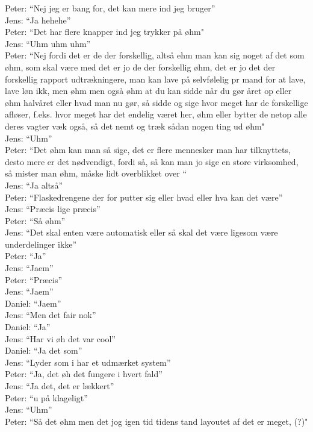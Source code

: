 Peter: “Nej jeg er bang for, det kan mere ind jeg bruger”\\
Jens: “Ja hehehe”\\
Peter: “Det har flere knapper ind jeg trykker på øhm"\\
Jens: “Uhm uhm uhm”\\
Peter: “Nej fordi det er de der forskellig, altså ehm man kan sig noget af det som øhm, som skal være med det er jo de der forskellig øhm, det er jo det der forskellig rapport udtrækningere, man kan lave på selvfølelig pr mand for at lave, lave løn ikk, men øhm men også øhm at du kan sidde når du gør året op eller øhm halvåret eller hvad man nu gør, så sidde og sige hvor meget har de forskellige afløser, f.eks. hvor meget har det endelig været her, øhm eller bytter de netop alle deres vagter væk også, så det nemt og træk sådan nogen  ting ud øhm"\\
Jens: “Uhm”\\
Peter: “Det øhm kan man så sige, det er flere mennesker man har tilknyttets, desto mere er det nødvendigt, fordi så, så kan man jo sige en store virksomhed, så mister man øhm, måske lidt overblikket over “\\
Jens: “Ja altså”\\
Peter: “Flaskedrengene der for putter sig eller hvad eller hva kan det være”\\
Jens: “Præcis lige præcis”\\
Peter: “Så øhm”\\
Jens: “Det skal enten være automatisk eller så skal det være ligesom være underdelinger ikke”\\
Peter: “Ja”\\
Jens: “Jaem”\\
Peter: “Præcis”\\
Jens: “Jaem”\\
Daniel: “Jaem”\\
Jens: “Men det fair nok”\\
Daniel: “Ja”\\
Jens: “Har vi øh det var cool”\\
Daniel: “Ja det som”\\
Jens: “Lyder som i har et udmærket system”\\
Peter: “Ja, det øh det fungere i hvert fald”\\
Jens: “Ja det, det er lækkert”\\
Peter: “u på klageligt”\\
Jens: “Uhm”\\
Peter: “Så det øhm men det jog igen tid tidens tand layoutet af det er meget, (?)"\\ 
